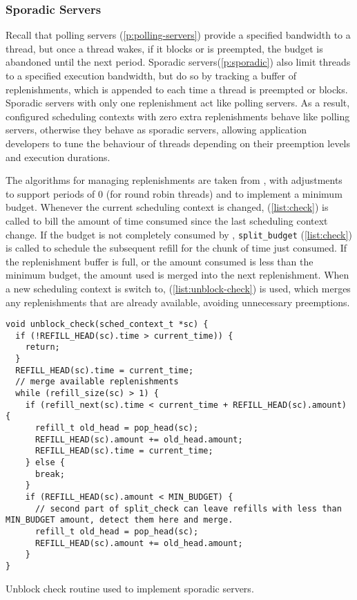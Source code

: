 \subsubsection{Sporadic Servers}
\label{sec:impl-sporadic}

Recall that polling servers (\cref{p:polling-servers}) provide a specified bandwidth to a thread,
but once a thread wakes, if it blocks or is preempted, the budget is abandoned until the next
period. Sporadic servers(\cref{p:sporadic}) also limit threads to a specified execution bandwidth,
but do so by tracking a buffer of replenishments, which is appended to each time a thread is
preempted or blocks. Sporadic servers with only one replenishment act like polling servers.
As a result, configured scheduling contexts with zero extra replenishments behave like polling servers,
otherwise they behave as sporadic servers,  allowing application developers to
tune the behaviour of threads depending on their preemption levels and execution durations.

The algorithms for managing replenishments are taken from \citet{Danish_LW_11}, with adjustments to
support periods of 0 (for round robin threads) and to implement a minimum budget.  Whenever the
current scheduling context is changed,  (\cref{list:check}) is called to bill the amount of time consumed since the last scheduling
context change. If the budget is not completely consumed by ,
\texttt{split\_budget} (\cref{list:check}) is called to schedule the
subsequent refill for the chunk of time just consumed.  If the replenishment buffer is full, or the
amount consumed is less than the minimum budget, the amount used is merged into the next
replenishment.  When a new scheduling context is switch to,  
(\cref{list:unblock-check}) is used, which merges any replenishments that are already available,
avoiding unnecessary preemptions.

\begin{listing}[t!]
\begin{verbatim}
void unblock_check(sched_context_t *sc) {
  if (!REFILL_HEAD(sc).time > current_time)) {
    return;
  }
  REFILL_HEAD(sc).time = current_time;
  // merge available replenishments
  while (refill_size(sc) > 1) {
    if (refill_next(sc).time < current_time + REFILL_HEAD(sc).amount) {
      refill_t old_head = pop_head(sc);
      REFILL_HEAD(sc).amount += old_head.amount;
      REFILL_HEAD(sc).time = current_time;
    } else {
      break;
    }
    if (REFILL_HEAD(sc).amount < MIN_BUDGET) {
      // second part of split_check can leave refills with less than MIN_BUDGET amount, detect them here and merge.
      refill_t old_head = pop_head(sc);
      REFILL_HEAD(sc).amount += old_head.amount;
    }
}
\end{verbatim}
\caption[Unblock check routine.]{Unblock check routine used to implement sporadic servers.}
\label{list:unblock-check}
\end{listing}
\clearpage

